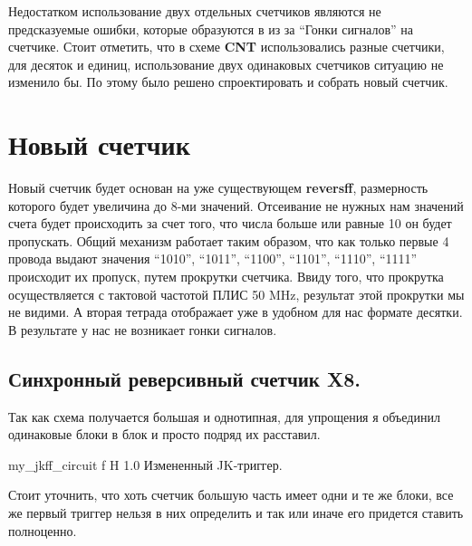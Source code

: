 \documentclass{bmstu}
\begin{document}
	\begin{flushleft}
		Недостатком использование двух отдельных счетчиков являются не предсказуемые ошибки, которые образуются в из за ``Гонки сигналов'' на счетчике. Стоит отметить, что в схеме \textbf{CNT} использовались разные счетчики, для десяток и единиц, использование двух одинаковых счетчиков ситуацию не изменило бы.
		По этому было решено спроектировать и собрать новый счетчик. 
	\end{flushleft}
	
	\section{Новый счетчик}
	
	\begin{flushleft}
		Новый счетчик будет основан на уже существующем \textbf{reversff}, размерность которого будет увеличина до 8-ми значений. Отсеивание не нужных нам значений счета будет происходить за счет того, что числа больше или равные 10 он будет пропускать. Общий механизм работает таким образом, что как только первые 4 провода выдают значения ``1010'', ``1011'', ``1100'', ``1101'', ``1110'', ``1111'' \- происходит их пропуск, путем прокрутки счетчика. Ввиду того, что прокрутка осуществляется с тактовой частотой ПЛИС 50 MHz, результат этой прокрутки мы не видими. А вторая тетрада отображает уже в удобном для нас формате десятки. В результате у нас не возникает гонки сигналов. 
	\end{flushleft}
	
	\subsection{Синхронный реверсивный счетчик X8.}
	
	\begin{flushleft}
		Так как схема получается большая и однотипная, для упрощения я объединил одинаковые блоки в блок и просто подряд их расставил.
	\end{flushleft}
	
	\includeimage
	{my_jkff_circuit}
	{f} %
	{H} %
	{1.0\textwidth} %
	{Измененный JK-триггер.} %
	
	\begin{flushleft}
		Стоит уточнить, что хоть счетчик большую часть имеет одни и те же блоки, все же первый триггер нельзя в них определить и так или иначе его придется ставить полноценно.
	\end{flushleft}
	
\end{document}
